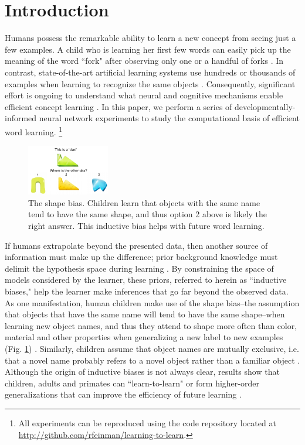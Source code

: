 \section{Introduction}

Humans possess the remarkable ability to learn a new concept from seeing just a
few examples. A child who is learning her first few words can easily pick up
the meaning of the word ``fork" after observing only one or a handful of forks
\citep{Bloom2000}. In contrast, state-of-the-art artificial learning systems use
hundreds or thousands of examples when learning to recognize the same objects
\citep[e.g.,][]{Krizhevsky2012, Szegedy2015}. Consequently, significant
effort is ongoing to understand what neural and cognitive mechanisms enable
efficient concept learning \citep{Lake2017}. In this paper, we perform a series
of developmentally-informed neural network experiments to study the
computational basis of efficient word learning. \footnote{All experiments can be
reproduced using the code repository located at
\url{http://github.com/rfeinman/learning-to-learn}.}

\begin{figure}[h!]
    \begin{center}
        \includegraphics[width=0.32\textwidth]{figures/shape_bias_demo.pdf}
    \end{center}
    \caption{The shape bias. Children learn that objects with the same name
    tend to have the same shape, and thus option 2 above is likely the right
    answer. This inductive bias helps with future word learning.}
    \label{fig:shape_bias_demo}
\end{figure}

If humans extrapolate beyond the presented data, then another source of
information must make up the difference; prior background knowledge must
delimit the hypothesis space during learning \citep{Tenenbaum2011, Lake2017}. By
constraining the space of models considered by the learner, these priors,
referred to herein as ``inductive biases," help the learner make inferences
that go far beyond the observed data. As one manifestation, human children make
use of the shape bias--the assumption that objects that have the same name will
tend to have the same shape--when learning new object names, and thus they
attend to shape more often than color, material and other properties when
generalizing a new label to new examples (Fig. \ref{fig:shape_bias_demo}) \citep{Landau1988}.
Similarly, children assume that object names are mutually exclusive, i.e. that
a novel name probably refers to a novel object rather than a familiar object
\citep{Markman1988}. Although the origin of inductive biases is not always
clear, results show that children, adults and primates can ``learn-to-learn" or
form higher-order generalizations that can improve the efficiency of future
learning \citep{Harlow1949, Smith2002, Dewar2010}.


